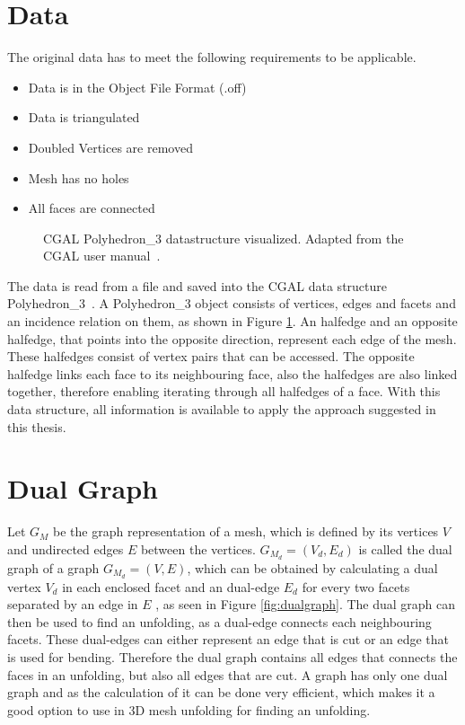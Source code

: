\documentclass[draft,final]{vutinfth} %
\begin{document}
\section{Data}
The original data has to meet the following requirements to be applicable.

\begin{itemize}
	\item Data is in the Object File Format (.off)
	\item Data is triangulated
	\item Doubled Vertices are removed
	\item Mesh has no holes
	\item All faces are connected
\end{itemize}

\begin{figure}

\caption{CGAL Polyhedron\_3 datastructure visualized. Adapted from the CGAL user manual~\cite{cgal:eb-19a}.}
\label{fig:cgal}
\end{figure}

The data is read from a file and saved into the CGAL data structure Polyhedron\_3~\cite{cgal:eb-19a}. A Polyhedron\_3 object consists of vertices, edges and facets and an incidence relation on them, as shown in Figure \ref{fig:cgal}. An halfedge and an opposite halfedge, that points into the opposite direction, represent each edge of the mesh. These halfedges consist of vertex pairs that can be accessed. The opposite halfedge links each face to its neighbouring face, also the halfedges are also linked together, therefore enabling iterating through all halfedges of a face. With this data structure, all information is available to apply the approach suggested in this thesis.

\section{Dual Graph}

Let $G_M$ be the graph representation of a mesh, which is defined by its vertices $V$ and undirected edges $E$ between the vertices. $G_{M_d} = (V_d, E_d)$ is called the dual graph of a graph $G_{M_d} = (V,E)$, which can be obtained by calculating a dual vertex $V_d$ in each enclosed facet and an dual-edge $E_d$ for every two facets separated by an edge in $E$ \cite{gross2004handbook}, as seen in Figure \ref{fig:dualgraph}. The dual graph can then be used to find an unfolding, as a dual-edge connects each neighbouring facets. These dual-edges can either represent an edge that is cut or an edge that is used for bending. Therefore the dual graph contains all edges that connects the faces in an unfolding, but also all edges that are cut. A graph has only one dual graph and as the calculation of it can be done very efficient, which makes it a good option to use in 3D mesh unfolding for finding an unfolding.
\end{document}
